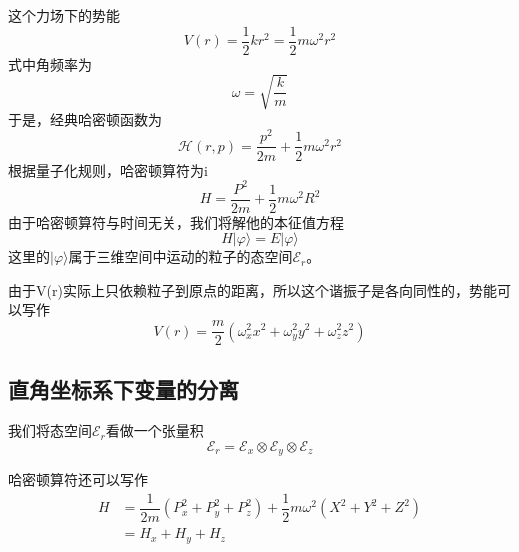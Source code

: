 \documentclass[]{article}
\begin{document}
这个力场下的势能
\begin{equation}
	V(r)=\dfrac{1}{2}kr^2=\dfrac{1}{2}m\omega^2r^2
\end{equation}
式中角频率为
\begin{equation}
	\omega=\sqrt{\dfrac{k}{m}}
\end{equation}
于是，经典哈密顿函数为
\begin{equation}
	\mathscr{H}(r,p)=\dfrac{p^2}{2m}+\dfrac{1}{2}m\omega^2r^2
\end{equation}
根据量子化规则，哈密顿算符为i
\begin{equation}
	H=\dfrac{P^2}{2m}+\dfrac{1}{2}m\omega^2R^2
\end{equation}
由于哈密顿算符与时间无关，我们将解他的本征值方程
\begin{equation}
	H|\varphi\rangle=E|\varphi\rangle
	\label{V6}
\end{equation}
这里的$|\varphi\rangle$属于三维空间中运动的粒子的态空间$\mathscr{E}_r$。\par 
由于V(r)实际上只依赖粒子到原点的距离，所以这个谐振子是各向同性的，势能可以写作
\begin{equation}
	V(r)=\dfrac{m}{2}(\omega^2_xx^2+\omega^2_yy^2+\omega^2_zz^2)
\end{equation}
\subsection{直角坐标系下变量的分离}
我们将态空间$\mathscr{E}_r$看做一个张量积
\begin{equation}
	\mathscr{E}_r=\mathscr{E}_x\otimes\mathscr{E}_y\otimes\mathscr{E}_z
\end{equation}

哈密顿算符还可以写作
\begin{align}
	H&=\dfrac{1}{2m}(P_x^2+P_y^2+P_z^2)+\dfrac{1}{2}m\omega^2(X^2+Y^2+Z^2)\nonumber\\
	 &=H_x+H_y+H_z
	 \label{V9}
\end{align}
\end{document}
